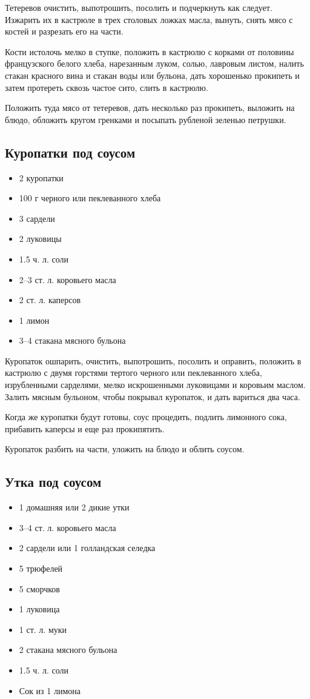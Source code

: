 Тетеревов очистить, выпотрошить, посолить и подчеркнуть как следует. Изжарить их в кастрюле в трех столовых ложках масла, вынуть, снять мясо с костей и разрезать его на части.

Кости истолочь мелко в ступке, положить в кастрюлю с корками от половины французского белого хлеба, нарезанным луком, солью, лавровым листом, налить стакан красного вина и стакан воды или бульона, дать хорошенько прокипеть и затем протереть сквозь частое сито, слить в кастрюлю.

Положить туда мясо от тетеревов, дать несколько раз прокипеть, выложить на блюдо, обложить кругом гренками и посыпать рубленой зеленью петрушки.

\subsection{Куропатки под соусом}

\begin{itemize}
	\item 2 куропатки 
    \item 100 г черного или пеклеванного хлеба 
    \item 3 сардели
    \item 2 луковицы 
    \item 1.5 ч. л. соли 
    \item 2–3 ст. л. коровьего масла
    \item 2 ст. л. каперсов 
    \item 1 лимон 
    \item 3–4 стакана мясного бульона
\end{itemize}

Куропаток ошпарить, очистить, выпотрошить, посолить и оправить, положить в кастрюлю с двумя горстями тертого черного или пеклеванного хлеба, изрубленными сарделями, мелко искрошенными луковицами и коровьим маслом. Залить мясным бульоном, чтобы покрывал куропаток, и дать вариться два часа.

Когда же куропатки будут готовы, соус процедить, подлить лимонного сока, прибавить каперсы и еще раз прокипятить.

Куропаток разбить на части, уложить на блюдо и облить соусом.

\subsection{Утка под соусом}

\begin{itemize}
	\item 1 домашняя или 2 дикие утки
    \item 3–4 ст. л. коровьего масла 
    \item 2 сардели или 1 голландская селедка
    \item 5 трюфелей
    \item 5 сморчков 
    \item 1 луковица 
    \item 1 ст. л. муки
    \item 2 стакана мясного бульона
    \item 1.5 ч. л. соли 
    \item Сок из 1 лимона
\end{itemize}

